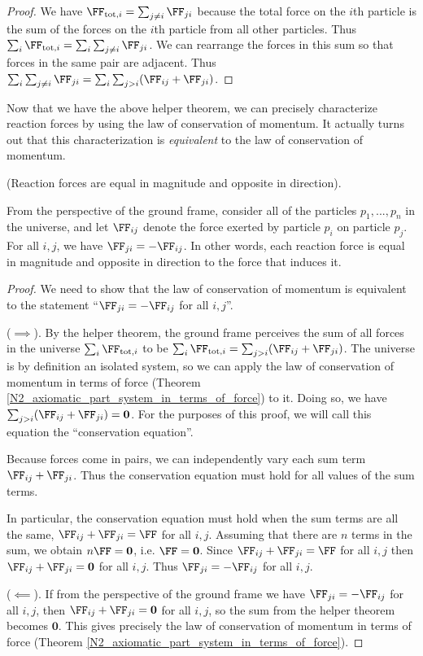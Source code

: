 \documentclass{article}
\begin{document}
\begin{proof}
	We have $\FF_{\text{tot}, i} = \sum_{j \neq i} \FF_{ji}$ because the total force on the $i$th particle is the sum of the forces on the $i$th particle from all other particles. Thus $\sum_i \FF_{\text{tot}, i} = \sum_i \sum_{j \neq i} \FF_{ji}$. We can rearrange the forces in this sum so that forces in the same pair are adjacent. Thus $\sum_i \sum_{j \neq i} \FF_{ji} = \sum_i \sum_{j > i} (\FF_{ij} + \FF_{ji})$. 
\end{proof}

Now that we have the above helper theorem, we can precisely characterize reaction forces by using the law of conservation of momentum. It actually turns out that this characterization is \textit{equivalent} to the law of conservation of momentum.

\begin{theorem}
	(Reaction forces are equal in magnitude and opposite in direction).
	
	From the perspective of the ground frame, consider all of the particles $p_1, ..., p_n$ in the universe, and let $\FF_{ij}$ denote the force exerted by particle $p_i$ on particle $p_j$. For all $i, j$, we have $\FF_{ji} = -\FF_{ij}$. In other words, each reaction force is equal in magnitude and opposite in direction to the force that induces it.
\end{theorem}

\begin{proof}
	We need to show that the law of conservation of momentum is equivalent to the statement ``$\FF_{ji} = -\FF_{ij}$ for all $i, j$''.
	
	($\implies$). By the helper theorem, the ground frame perceives the sum of all forces in the universe $\sum_i \FF_{\text{tot}, i}$ to be $\sum_i \FF_{\text{tot}, i} = {\sum_{j > i} (\FF_{ij} + \FF_{ji})}$. The universe is by definition an isolated system, so we can apply the law of conservation of momentum in terms of force (Theorem \ref{N2_axiomatic_part_system_in_terms_of_force}) to it. Doing so, we have $\sum_{j > i} (\FF_{ij} + \FF_{ji}) = \mathbf{0}$. For the purposes of this proof, we will call this equation the ``conservation equation''.
	
	Because forces come in pairs, we can independently vary each sum term $\FF_{ij} + \FF_{ji}$. Thus the conservation equation must hold for all values of the sum terms.
	
	In particular, the conservation equation must hold when the sum terms are all the same, $\FF_{ij} + \FF_{ji} = \FF$ for all $i, j$. Assuming that there are $n$ terms in the sum, we obtain $n\FF = \mathbf{0}$, i.e. $\FF = \mathbf{0}$. Since $\FF_{ij} + \FF_{ji} = \FF$ for all $i, j$ then $\FF_{ij} + \FF_{ji} = \mathbf{0}$ for all $i, j$. Thus $\FF_{ji} = -\FF_{ij}$ for all $i, j$.
	
	($\impliedby$). If from the perspective of the ground frame we have $\FF_{ji} = -\FF_{ij}$ for all $i, j$, then $\FF_{ij} + \FF_{ji} = \mathbf{0}$ for all $i, j$, so the sum from the helper theorem becomes $\mathbf{0}$. This gives precisely the law of conservation of momentum in terms of force (Theorem \ref{N2_axiomatic_part_system_in_terms_of_force}).
\end{proof}
\end{document}
